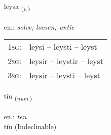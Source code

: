\documentclass[frontgrid, backgrid]{flacards}\usepackage[]{graphicx}\usepackage[]{xcolor}
\begin{document}
\renewcommand{\flhead}{\vskip5pt \fboxsep=0pt {\small\bfseries\footnotesize Sagnorð | Verb}}
\renewcommand{\fcfoot}{\vskip5pt \fboxsep=0pt \hspace{2pt}{\small\bfseries\footnotesize 1K}}

\renewcommand{\blhead}{\vskip5pt {\small\bfseries\footnotesize Sagnorð | Verb }}
\renewcommand{\bcfoot}{\vskip5pt \hspace{2pt}{\small\bfseries\footnotesize 1K}}


{leysa \small{\textsubscript{(\textit{v.})}} \\[1ex] %
\textphonetic{[leiːsa]} \\
en.: \emph{solve; loosen; untie} \\  [2ex]
\renewcommand*{\arraystretch}{0.8}
\begin{tabular}{p{1cm}l}
\textsc{1sg}: & leysi -- leysti -- leyst \\ 
\textsc{2sg}: & leysir -- leystir -- leyst \\ 
\textsc{3sg}: & leysir -- leysti -- leyst \\ 
\end{tabular}
}


\renewcommand{\flhead}{\vskip5pt \fboxsep=0pt {\small\bfseries\footnotesize Töluorð | Numeral}}
\renewcommand{\fcfoot}{\vskip5pt \fboxsep=0pt \hspace{2pt}{\small\bfseries\footnotesize 1K}}

\renewcommand{\blhead}{\vskip5pt {\small\bfseries\footnotesize Töluorð | Numeral }}
\renewcommand{\bcfoot}{\vskip5pt \hspace{2pt}{\small\bfseries\footnotesize 1K}}


{tíu \small{\textsubscript{(\textit{num.})}} \\[1ex]
\textphonetic{[tʰijʏ]} \\
en.: \emph{ten} \\  [2ex]
tíu (Indeclinable)}

\renewcommand{\flhead}{\vskip5pt \fboxsep=0pt {\small\bfseries\footnotesize Lýsingarorð | Adjective}}
\renewcommand{\fcfoot}{\vskip5pt \fboxsep=0pt \hspace{2pt}{\small\bfseries\footnotesize 1K}}
\end{document}
